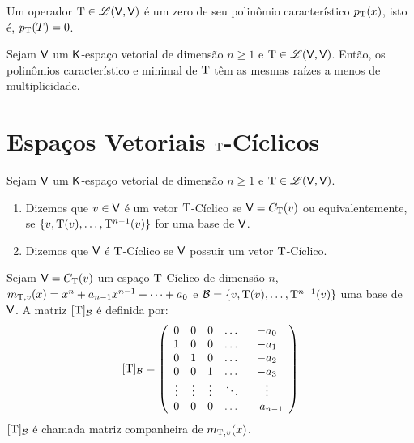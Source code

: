 \documentclass[10pt,a4paper]{book}
\begin{document}
\begin{theorem}
	Um operador $\mathrm{ T } \in \mathscr{ L }(\mathsf{ V }, \mathsf{ V })$ é um zero de seu polinômio característico $p_{\mathrm{ T }}(x)$, isto é, $p_{\mathrm{ T }}(T) = 0$.
\end{theorem}



\begin{proposition}
	Sejam $\mathsf{ V }$ um $\mathsf{ K }$-espaço vetorial de dimensão $n \geq 1$ e $\mathrm{ T } \in \mathscr{ L }(\mathsf{ V }, \mathsf{ V })$. Então, os polinômios característico e minimal de $\mathrm{ T }$ têm as mesmas raízes a menos de multiplicidade.
\end{proposition}




\section{Espaços Vetoriais $\mathrm{ T }$-Cíclicos}

\begin{definition}
	Sejam $\mathsf{ V }$ um $\mathsf{ K }$-espaço vetorial de dimensão $n \geq 1$ e $\mathrm{ T } \in \mathscr{ L }(\mathsf{ V }, \mathsf{ V })$. 
	\begin{enumerate}
		\item Dizemos que $v \in \mathsf{ V }$ é um vetor $\mathrm{ T }$-Cíclico se $\mathsf{ V } = C_{\mathrm{ T }}(v)$ ou equivalentemente, se $\{ v, \mathrm{ T }(v), \dots, \mathrm{ T } ^ {n - 1}(v)\}$ for uma base de $\mathsf{ V }$.
		\item Dizemos que $\mathsf{ V }$ é $\mathrm{ T }$-Cíclico se $\mathsf{ V }$ possuir um vetor $\mathrm{ T }$-Cíclico.
	\end{enumerate}
\end{definition}

\begin{definition}
	Sejam $\mathsf{ V } = C_{\mathrm{ T }}(v)$ um espaço $\mathrm{ T }$-Cíclico de dimensão $n$,  $m_{\mathrm{ T },v}(x) = x ^ n + a_{n - 1} x ^ {n - 1} + \dots + a_0$ e $\mathcal{ B } = \{ v, \mathrm{ T }(v), \dots, \mathrm{ T } ^ {n - 1}(v)\}$ uma base de $\mathsf{ V }$. A matriz $[\mathrm{ T }]_{\mathcal{ B }}$ é definida por:
	\[
		[\mathrm{ T }]_{\mathcal{ B }} = \left( 
			\begin{array}{ccccc}
				0      & 0      & 0      & \dots  &     -a_0 \\
				1      & 0      & 0      & \dots  &     -a_1 \\
				0      & 1      & 0      & \dots  &     -a_2 \\
				0      & 0      & 1      & \dots  &     -a_3 \\
				\vdots & \vdots & \vdots & \ddots &   \vdots \\
				0      & 0      & 0      & \dots  & -a_{n-1}
			\end{array}
		\right)
	\]
	$[\mathrm{ T }]_{\mathcal{ B }}$ é chamada matriz companheira de $m_{\mathrm{ T },v}(x)$.
\end{definition}
\end{document}

